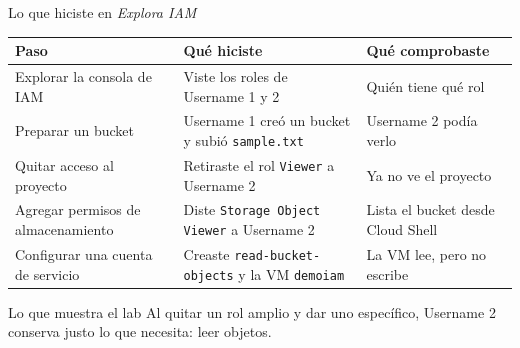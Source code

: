 \documentclass[aspectratio=169,10pt,c]{beamer}
\begin{document}
\begin{frame}{Lo que hiciste en \textit{Explora IAM}}
\renewcommand{\arraystretch}{1.24}
\centering\small
\begin{tabular}{@{}p{4.6cm}p{4.3cm}p{3.6cm}@{}}
\toprule
\textbf{Paso} & \textbf{Qué hiciste} & \textbf{Qué comprobaste}\\
\midrule
Explorar la consola de IAM & Viste los roles de Username 1 y 2 & Quién tiene qué rol\\
Preparar un bucket & Username 1 creó un bucket y subió \texttt{sample.txt} & Username 2 podía verlo\\
Quitar acceso al proyecto & Retiraste el rol \texttt{Viewer} a Username 2 & Ya no ve el proyecto\\
Agregar permisos de almacenamiento & Diste \texttt{Storage Object Viewer} a Username 2 & Lista el bucket desde Cloud Shell\\
Configurar una cuenta de servicio & Creaste \texttt{read-bucket-objects} y la VM \texttt{demoiam} & La VM lee, pero no escribe\\
\bottomrule
\end{tabular}
\par\vspace{3mm}
\begin{alertblock}{Lo que muestra el lab}
\small Al quitar un rol amplio y dar uno específico, Username 2 conserva justo lo que necesita: leer objetos.
\end{alertblock}
\end{frame}
\end{document}
